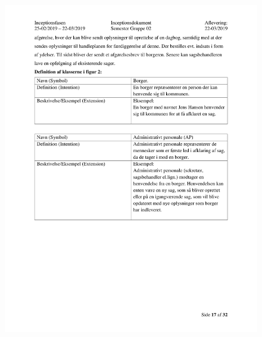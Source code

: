 \begin{figure}[hb]
  \includegraphics[scale = 0.33]{./PNG/Inceptions/Gruppe02+InceptionsDokument-18.jpg} 
\end{figure}

